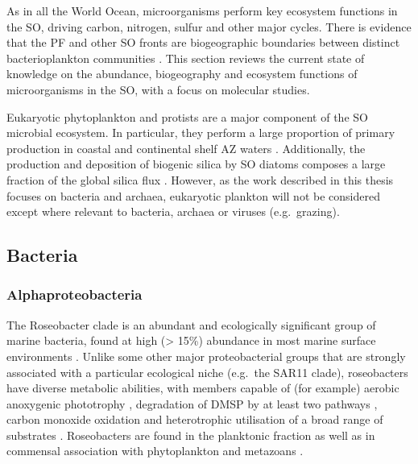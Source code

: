 As in all the World Ocean, microorganisms perform key ecosystem functions in the \ac{SO}, driving carbon, nitrogen, sulfur and other major cycles.
There is evidence that the \ac{PF} and other \ac{SO} fronts are biogeographic boundaries between distinct bacterioplankton communities \citep[e.g.][]{Selje:2004ka,Abell:2005ji,Giebel:2009hr,Weber:2010fi}.
This section reviews the current state of knowledge on the abundance, biogeography and ecosystem functions of microorganisms in the \ac{SO}, with a focus on molecular studies.

Eukaryotic phytoplankton and protists are a major component of the \ac{SO} microbial ecosystem.
In particular, they perform a large proportion of primary production in coastal and continental shelf \ac{AZ} waters \citep[e.g.][]{ElSayed:2005jq}.
Additionally, the production and deposition of biogenic silica by \ac{SO} diatoms composes a large fraction of the global silica flux \cite{Treguer:1995kz}.
However, as the work described in this thesis focuses on bacteria and archaea, eukaryotic plankton will not be considered except where relevant to bacteria, archaea or viruses (e.g.\ grazing).

\subsection{Bacteria}

\subsubsection{Alphaproteobacteria}


The Roseobacter clade is an abundant and ecologically significant group of marine bacteria, found at high (> 15\%) abundance in most marine surface environments \citep[][and references therein]{Buchan:2005hd}.
Unlike some other major proteobacterial groups that are strongly associated with a particular ecological niche (e.g.\ the SAR11 clade), roseobacters have diverse metabolic abilities, with members capable of (for example) aerobic anoxygenic phototrophy \cite{Biebl:2005fp,Beja:2002gt}, degradation of \ac{DMSP} by at least two pathways \cite{Miller:2004jz,Moran:2003cwa}, carbon monoxide oxidation \cite{King:2003kc} and heterotrophic utilisation of a broad range of substrates \citep[reviewed in][]{Brinkhoff:2008do}.
Roseobacters are found in the planktonic fraction as well as in commensal association with phytoplankton and metazoans \citep[reviewed in][]{Buchan:2005hd}.

